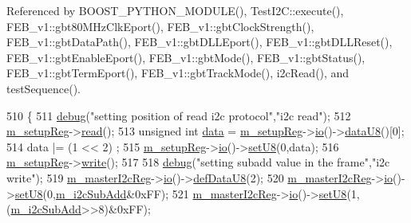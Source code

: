 Referenced by B\+O\+O\+S\+T\+\_\+\+P\+Y\+T\+H\+O\+N\+\_\+\+M\+O\+D\+U\+L\+E(), Test\+I2\+C\+::execute(), F\+E\+B\+\_\+v1\+::gbt80\+M\+Hz\+Clk\+Eport(), F\+E\+B\+\_\+v1\+::gbt\+Clock\+Strength(), F\+E\+B\+\_\+v1\+::gbt\+Data\+Path(), F\+E\+B\+\_\+v1\+::gbt\+D\+L\+L\+Eport(), F\+E\+B\+\_\+v1\+::gbt\+D\+L\+L\+Reset(), F\+E\+B\+\_\+v1\+::gbt\+Enable\+Eport(), F\+E\+B\+\_\+v1\+::gbt\+Mode(), F\+E\+B\+\_\+v1\+::gbt\+Status(), F\+E\+B\+\_\+v1\+::gbt\+Term\+Eport(), F\+E\+B\+\_\+v1\+::gbt\+Track\+Mode(), i2c\+Read(), and test\+Sequence().


\begin{DoxyCode}
510                            \{
511   \hyperlink{classObject_aac010553f022165573714b7014a15f0d}{debug}(\textcolor{stringliteral}{"setting position of read i2c protocol"},\textcolor{stringliteral}{"i2c read"});
512   \hyperlink{classSeqPGA_a03269241e7fc26493cd0595beda334c2}{m\_setupReg}->\hyperlink{classIOobject_aa07610c11963b1db6710e3c76ceea456}{read}();
513   \textcolor{keywordtype}{unsigned} \textcolor{keywordtype}{int} \hyperlink{namespaceshell_a5ea2525995cedc3efd69ea8a7f034d1e}{data} = \hyperlink{classSeqPGA_a03269241e7fc26493cd0595beda334c2}{m\_setupReg}->\hyperlink{classIOobject_af04fb94137c3d86849f478ac5afab5d1}{io}()->\hyperlink{classIOdata_a75e9c318dbac3a39402179070943d4bc}{dataU8}()[0];
514   data |= (1 << 2)  ;     
515   \hyperlink{classSeqPGA_a03269241e7fc26493cd0595beda334c2}{m\_setupReg}->\hyperlink{classIOobject_af04fb94137c3d86849f478ac5afab5d1}{io}()->\hyperlink{classIOdata_a6c4fb2f2af01889ada889c2b7aceb24d}{setU8}(0,data);
516   \hyperlink{classSeqPGA_a03269241e7fc26493cd0595beda334c2}{m\_setupReg}->\hyperlink{classIOobject_a9f6984bc9f0fadcf800f1be2523ac744}{write}();
517     
518   \hyperlink{classObject_aac010553f022165573714b7014a15f0d}{debug}(\textcolor{stringliteral}{"setting subadd value in the frame"},\textcolor{stringliteral}{"i2c write"});
519   \hyperlink{classSeqPGA_a942c71b33a4f43b7a994cb9216abb17e}{m\_masterI2cReg}->\hyperlink{classIOobject_af04fb94137c3d86849f478ac5afab5d1}{io}()->\hyperlink{classIOdata_a80bb230b61062b447db5832e43bf7b44}{defDataU8}(2);
520   \hyperlink{classSeqPGA_a942c71b33a4f43b7a994cb9216abb17e}{m\_masterI2cReg}->\hyperlink{classIOobject_af04fb94137c3d86849f478ac5afab5d1}{io}()->\hyperlink{classIOdata_a6c4fb2f2af01889ada889c2b7aceb24d}{setU8}(0,\hyperlink{classSeqPGA_a82bda98edb9681aff47733e83ac8bc4f}{m\_i2cSubAdd}&0xFF);
521   \hyperlink{classSeqPGA_a942c71b33a4f43b7a994cb9216abb17e}{m\_masterI2cReg}->\hyperlink{classIOobject_af04fb94137c3d86849f478ac5afab5d1}{io}()->\hyperlink{classIOdata_a6c4fb2f2af01889ada889c2b7aceb24d}{setU8}(1,(\hyperlink{classSeqPGA_a82bda98edb9681aff47733e83ac8bc4f}{m\_i2cSubAdd}>>8)&0xFF);

\end{DoxyCode}
